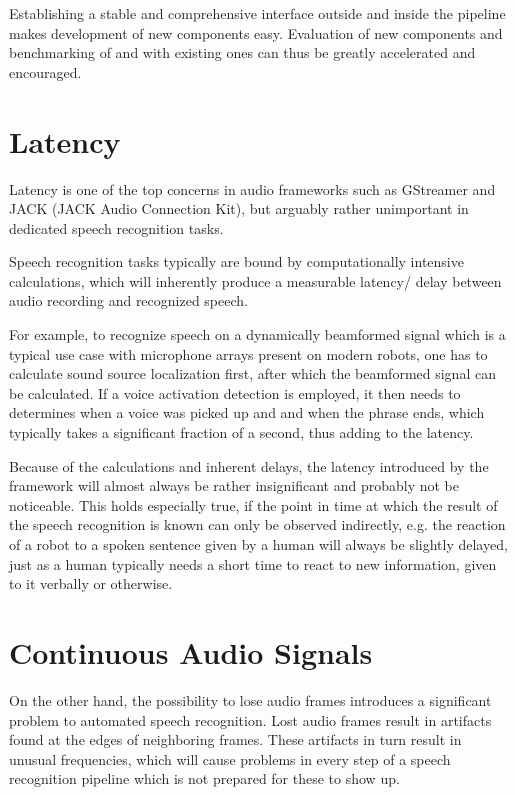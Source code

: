 Establishing a stable and comprehensive interface outside and inside the pipeline makes development of new components easy. 
Evaluation of new components and benchmarking of and with existing ones can thus be greatly accelerated and encouraged.%

\section{Latency}
Latency is one of the top concerns in audio frameworks such as GStreamer and JACK (JACK Audio Connection Kit), but arguably rather unimportant in dedicated speech recognition tasks. 
	
Speech recognition tasks typically are bound by computationally intensive calculations, which will inherently produce a measurable latency/ delay between audio recording and recognized speech.  
	
For example, to recognize speech on a dynamically beamformed signal which is a typical use case with microphone arrays present on modern robots, one has to calculate sound source localization first, after which the beamformed signal can be calculated.
If a voice activation detection is employed, it then needs to determines when a voice was picked up and and when the phrase ends, which typically takes a significant fraction of a second, thus adding to the latency. 
	
Because of the calculations and inherent delays, the latency introduced by the framework will almost always be rather insignificant and probably not be noticeable. 
This holds especially true, if the point in time at which the result of the speech recognition is known can only be observed indirectly, e.g. the reaction of a robot to a spoken sentence given by a human will always be slightly delayed, just as a human typically needs a short time to react to new information, given to it verbally or otherwise.

\section{Continuous Audio Signals}
On the other hand, the possibility to lose audio frames introduces a significant problem to automated speech recognition.
Lost audio frames result in artifacts found at the edges of neighboring frames. 
These artifacts in turn result in unusual frequencies, which will cause problems in every step of a speech recognition pipeline which is not prepared for these to show up. 

